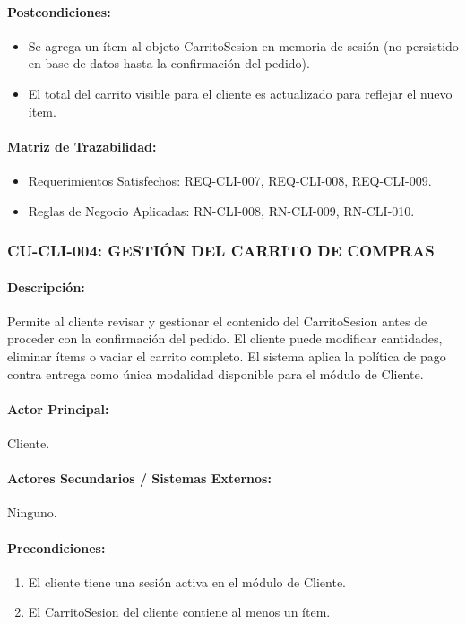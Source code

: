 \paragraph{Postcondiciones:}
\begin{itemize}
    \item Se agrega un ítem al objeto CarritoSesion en memoria de sesión (no persistido en base de datos hasta la confirmación del pedido).
    \item El total del carrito visible para el cliente es actualizado para reflejar el nuevo ítem.
\end{itemize}

\paragraph{Matriz de Trazabilidad:}
\begin{itemize}
    \item Requerimientos Satisfechos: REQ-CLI-007, REQ-CLI-008, REQ-CLI-009.
    \item Reglas de Negocio Aplicadas: RN-CLI-008, RN-CLI-009, RN-CLI-010.
\end{itemize}

\subsubsection{CU-CLI-004: GESTIÓN DEL CARRITO DE COMPRAS}
\paragraph{Descripción:} Permite al cliente revisar y gestionar el contenido del CarritoSesion antes de proceder con la confirmación del pedido. El cliente puede modificar cantidades, eliminar ítems o vaciar el carrito completo. El sistema aplica la política de pago contra entrega como única modalidad disponible para el módulo de Cliente.

\paragraph{Actor Principal:} Cliente.

\paragraph{Actores Secundarios / Sistemas Externos:} Ninguno.

\paragraph{Precondiciones:}
\begin{enumerate}
    \item[I.] El cliente tiene una sesión activa en el módulo de Cliente.
    \item[II.] El CarritoSesion del cliente contiene al menos un ítem.
\end{enumerate}


